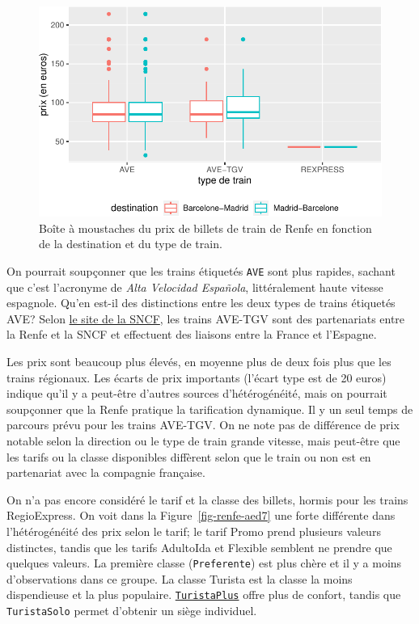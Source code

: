 \documentclass[
  11pt,
  letterpaper,
]{scrbook}
\theoremstyle{definition}
\theoremstyle{remark}
\begin{document}
\begin{figure}[ht!]

{\centering \includegraphics[width=1\textwidth,height=\textheight]{./01-analyseexploratoire_files/figure-pdf/fig-renfe-aed4-1.pdf}

}

\caption{\label{fig-renfe-aed4}Boîte à moustaches du prix de billets de
train de Renfe en fonction de la destination et du type de train.}

\end{figure}

On pourrait soupçonner que les trains étiquetés \texttt{AVE} sont plus
rapides, sachant que c'est l'acronyme de \emph{Alta Velocidad Española},
littéralement haute vitesse espagnole. Qu'en est-il des distinctions
entre les deux types de trains étiquetés AVE? Selon
\href{https://www.renfe-sncf.com/rw-en/services/a-unique-experience/Pages/services.aspx}{le
site de la SNCF}, les trains AVE-TGV sont des partenariats entre la
Renfe et la SNCF et effectuent des liaisons entre la France et
l'Espagne.

Les prix sont beaucoup plus élevés, en moyenne plus de deux fois plus
que les trains régionaux. Les écarts de prix importants (l'écart type
est de 20 euros) indique qu'il y a peut-être d'autres sources
d'hétérogénéité, mais on pourrait soupçonner que la Renfe pratique la
tarification dynamique. Il y un seul temps de parcours prévu pour les
trains AVE-TGV. On ne note pas de différence de prix notable selon la
direction ou le type de train grande vitesse, mais peut-être que les
tarifs ou la classe disponibles diffèrent selon que le train ou non est
en partenariat avec la compagnie française.

On n'a pas encore considéré le tarif et la classe des billets, hormis
pour les trains RegioExpress. On voit dans la
Figure~\ref{fig-renfe-aed7} une forte différente dans l'hétérogénéité
des prix selon le tarif; le tarif Promo prend plusieurs valeurs
distinctes, tandis que les tarifs AdultoIda et Flexible semblent ne
prendre que quelques valeurs. La première classe (\texttt{Preferente})
est plus chère et il y a moins d'observations dans ce groupe. La classe
Turista est la classe la moins dispendieuse et la plus populaire.
\href{http://web.archive.org/web/20161111134241/http://www.renfe.com/viajeros/tarifas/billete_promo.html}{\texttt{TuristaPlus}}
offre plus de confort, tandis que \texttt{TuristaSolo} permet d'obtenir
un siège individuel.
\end{document}
